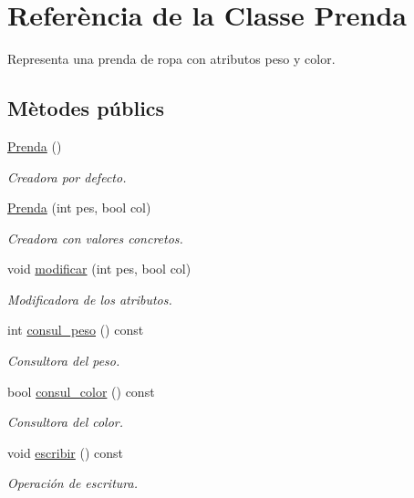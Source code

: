 \hypertarget{class_prenda}{\section{Referència de la Classe Prenda}
\label{class_prenda}
}


Representa una prenda de ropa con atributos peso y color.  


\subsection*{Mètodes públics}
\begin{DoxyCompactItemize}
\item 
\hyperlink{class_prenda_adfd86b131c7f40c58b0cb4200eb55129}{Prenda} ()
\begin{DoxyCompactList}\small\item\em Creadora por defecto. \end{DoxyCompactList}\item 
\hyperlink{class_prenda_af15ff723083040b89bc495b4ec4b914e}{Prenda} (int pes, bool col)
\begin{DoxyCompactList}\small\item\em Creadora con valores concretos. \end{DoxyCompactList}\item 
void \hyperlink{class_prenda_ab25b2a66034eb2c0fccfb1f3cedbb5a7}{modificar} (int pes, bool col)
\begin{DoxyCompactList}\small\item\em Modificadora de los atributos. \end{DoxyCompactList}\item 
int \hyperlink{class_prenda_ae886133326d46cc18dd9070d317a3ccb}{consul\+\_\+peso} () const 
\begin{DoxyCompactList}\small\item\em Consultora del peso. \end{DoxyCompactList}\item 
bool \hyperlink{class_prenda_a149632ba71127621c52917ef2e936c2e}{consul\+\_\+color} () const 
\begin{DoxyCompactList}\small\item\em Consultora del color. \end{DoxyCompactList}\item 
void \hyperlink{class_prenda_a3a5dfb75467c54157ec969b8ab7d752b}{escribir} () const 
\begin{DoxyCompactList}\small\item\em Operación de escritura. \end{DoxyCompactList}\end{DoxyCompactItemize}


